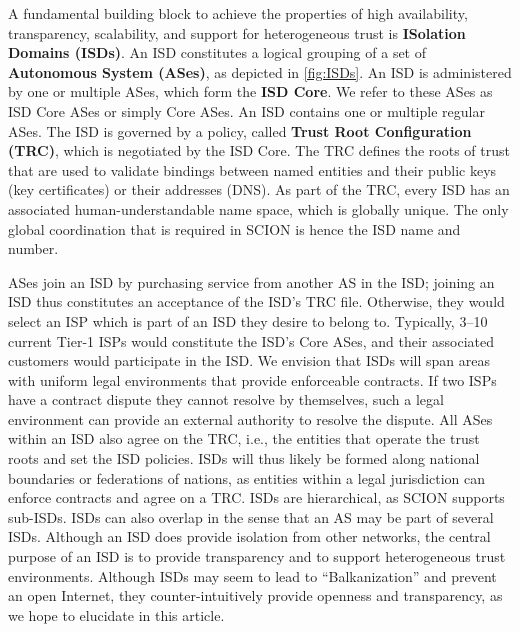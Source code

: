 \documentclass[a4paper]{llncs}
\newcommand\SCION{{\small\textsf{SCION}}\xspace}
\begin{document}
A fundamental building block to achieve the properties of high availability,
transparency, scalability, and support for heterogeneous trust is
\textbf{ISolation Domains (ISDs)}. An ISD constitutes a logical grouping of a
set of \textbf{Autonomous System (ASes)}, as depicted in \autoref{fig:ISDs}.
An ISD is administered by one or multiple ASes, which form the
\textbf{ISD Core}. We refer to these ASes as ISD Core ASes or simply Core
ASes. An ISD contains one or multiple regular ASes.
The ISD is governed by a policy, called
\textbf{Trust Root Configuration (TRC)}, which is negotiated by the
ISD Core. The TRC defines the roots of trust that are used to
validate bindings between named entities and their public keys (key
certificates) or their addresses (DNS). As part of the TRC, every ISD
has an associated human-understandable name space, which is globally
unique. The only global coordination that is required in \SCION is
hence the ISD name and number.

ASes join an ISD by purchasing service from another AS in the ISD; joining an
ISD thus constitutes an acceptance of the ISD's TRC file. Otherwise, they would
select an ISP which is part of an ISD they desire to belong to. Typically, 3--10
current Tier-1 ISPs would constitute the ISD's Core ASes, and their associated
customers would participate in the ISD. We envision that ISDs will span areas
with uniform legal environments that provide enforceable contracts. If two ISPs
have a contract dispute they cannot resolve by themselves, such a legal
environment can provide an external authority to resolve the dispute.  All ASes
within an ISD also agree on the TRC, i.e., the entities that operate the trust
roots and set the ISD policies. ISDs will thus likely be formed along national
boundaries or federations of nations, as entities within a legal jurisdiction
can enforce contracts and agree on a TRC.
ISDs are hierarchical, as \SCION supports sub-ISDs. ISDs can also overlap in the
sense that an AS may be part of several ISDs. Although an ISD does provide
isolation from other networks, the central purpose of an ISD is to provide
transparency and to support heterogeneous trust environments.  Although ISDs may
seem to lead to ``Balkanization'' and prevent an open Internet, they
counter-intuitively provide openness and transparency, as we hope to elucidate in
this article.
\end{document}
